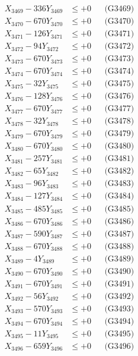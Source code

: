 \documentclass[a4paper,10pt]{article}
\begin{document}
{\begin{align}
X_{3469} - 336Y_{3469} &\leq +0 && \text{(G3469)} \\
X_{3470} - 670Y_{3470} &\leq +0 && \text{(G3470)} \\
\allowbreak
X_{3471} - 126Y_{3471} &\leq +0 && \text{(G3471)} \\
X_{3472} - 94Y_{3472} &\leq +0 && \text{(G3472)} \\
X_{3473} - 670Y_{3473} &\leq +0 && \text{(G3473)} \\
X_{3474} - 670Y_{3474} &\leq +0 && \text{(G3474)} \\
X_{3475} - 32Y_{3475} &\leq +0 && \text{(G3475)} \\
X_{3476} - 128Y_{3476} &\leq +0 && \text{(G3476)} \\
X_{3477} - 670Y_{3477} &\leq +0 && \text{(G3477)} \\
X_{3478} - 32Y_{3478} &\leq +0 && \text{(G3478)} \\
X_{3479} - 670Y_{3479} &\leq +0 && \text{(G3479)} \\
X_{3480} - 670Y_{3480} &\leq +0 && \text{(G3480)} \\
\allowbreak
X_{3481} - 257Y_{3481} &\leq +0 && \text{(G3481)} \\
X_{3482} - 65Y_{3482} &\leq +0 && \text{(G3482)} \\
X_{3483} - 96Y_{3483} &\leq +0 && \text{(G3483)} \\
X_{3484} - 127Y_{3484} &\leq +0 && \text{(G3484)} \\
X_{3485} - 485Y_{3485} &\leq +0 && \text{(G3485)} \\
X_{3486} - 670Y_{3486} &\leq +0 && \text{(G3486)} \\
X_{3487} - 590Y_{3487} &\leq +0 && \text{(G3487)} \\
X_{3488} - 670Y_{3488} &\leq +0 && \text{(G3488)} \\
X_{3489} - 4Y_{3489} &\leq +0 && \text{(G3489)} \\
X_{3490} - 670Y_{3490} &\leq +0 && \text{(G3490)} \\
\allowbreak
X_{3491} - 670Y_{3491} &\leq +0 && \text{(G3491)} \\
X_{3492} - 56Y_{3492} &\leq +0 && \text{(G3492)} \\
X_{3493} - 570Y_{3493} &\leq +0 && \text{(G3493)} \\
X_{3494} - 670Y_{3494} &\leq +0 && \text{(G3494)} \\
X_{3495} - 11Y_{3495} &\leq +0 && \text{(G3495)} \\
X_{3496} - 659Y_{3496} &\leq +0 && \text{(G3496)} \\

\end{align}}
\end{document}
